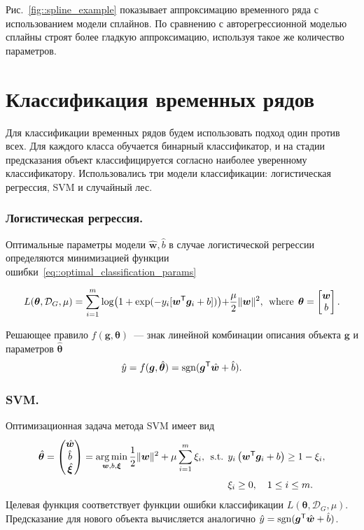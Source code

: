 \documentclass{llncs}
\DeclareMathOperator{\sgn}{\mathop{sgn}}
\DeclareMathOperator*{\argmin}{arg\,min}
\newcommand{\T}{{\mbox{\scriptsize\sffamily\upshape\mdseries T}}}
\begin{document}
Рис.~\ref{fig::spline_example} показывает аппроксимацию временного ряда с использованием модели сплайнов.
По сравнению с авторегрессионной моделью сплайны строят более гладкую аппроксимацию, используя такое же количество параметров.

\section{Классификация временных рядов}
Для классификации временных рядов будем использовать подход один против всех. 
Для каждого класса обучается бинарный классификатор, и на стадии предсказания объект классифицируется согласно наиболее уверенному классификатору.
Использовались три модели классификации: логистическая регрессия, SVM и случайный лес.

\subsubsection{Логистическая регрессия.}
Оптимальные параметры модели $\hat{\bm{w}}, \hat{b}$  в случае логистической регрессии определяются минимизацией функции ошибки~\eqref{eq::optimal_classification_params}

\begin{equation*}
L(\bm{\theta}, \mathcal{D}_G, \mu) = \sum_{i=1}^{m} \log\bigl(1 + \exp(-y_i [\bm{w}^{\T} \bm{g}_i + b])\bigl) + \frac{\mu}{2} \|\bm{w}\|^2, \:\:\mbox{where}\:\: \bm{\theta}  = \begin{bmatrix}
\bm{w} \\ b
\end{bmatrix}.
\end{equation*}

Решающее правило $f(\bm{g}, \bm{\theta})$~--- знак линейной комбинации описания объекта $\bm{g}$ и параметров $\hat{\bm{\theta}}$
\begin{equation*}
\hat{y} = f(\bm{g}, \hat{\bm{\theta}}) = \sgn(\bm{g}^{\T} \hat{\bm{w}} + \hat{b}).
\end{equation*}

\subsubsection{SVM.}
Оптимизационная задача метода SVM имеет вид
\begin{align*}
\hat{\bm{\theta}}  = \begin{pmatrix}
\hat{\bm{w}} \\ \hat{b} \\ \hat{\bm{\xi}}
\end{pmatrix}= \argmin_{\bm{w}, b, \bm{\xi}}  \frac{1}{2} \|\bm{w}\|^2 + \mu \sum_{i=1}^{m} \xi_i,\:\:
\mbox{s.t.} \:\: &y_i \left(\bm{w}^{\T} \bm{g}_i + b\right) \geq 1 - \xi_i,\\
&\xi_i \geq 0, \quad 1 \leq i \leq m.
\end{align*}
Целевая функция соответствует функции ошибки классификации $L(\bm{\theta}, \mathcal{D}_G, \mu)$.
Предсказание для нового объекта вычисляется аналогично $
\hat{y} = \sgn (\bm{g}^{\T} \hat{\bm{w}} + \hat{b})$.
\end{document}
